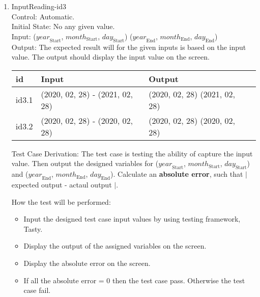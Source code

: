 \documentclass[12pt, titlepage]{article}
\begin{document}
\begin{enumerate}
\item{InputReading-id3\\}
Control: Automatic.\\
 
Initial State: No any given value.\\
Input: ($\mathit{year}_\text{Start}$, $\mathit{month}_\text{Start}$, $\mathit{day}_\text{Start}$)  ($\mathit{year}_\text{End}$, $\mathit{month}_\text{End}$, $\mathit{day}_\text{End}$)\\ 


Output: The expected result will for the given inputs is based on the input value.
The output should display the input value on the screen.

\noindent \begin{tabular}{l l l l} 
    \toprule		
    \textbf{id} & \textbf{Input} & \textbf{Output}\\ 
	\midrule
   id3.1 & (2020, 02, 28) - (2021, 02, 28) & (2020, 02, 28)  (2021, 02, 28)\\
   id3.2 & (2020, 02, 28) - (2020, 02, 28)  & (2020, 02, 28)  (2020, 02, 28)\\
    \bottomrule
  \end{tabular}


Test Case Derivation: The test case is testing the ability of capture the input value. Then output the designed variables for  ($\mathit{year}_\text{Start}$, $\mathit{month}_\text{Start}$, $\mathit{day}_\text{Start}$) and ($\mathit{year}_\text{End}$, $\mathit{month}_\text{End}$, $\mathit{day}_\text{End}$). Calculate an \textbf{absolute error}, such that $|$ expected output - actaul output $|$.


How the test will be performed:

\begin{itemize} 
\item Input the designed test case input values by using testing framework, Tasty. 
\item Display the output of the assigned variables on the screen.
\item  Display the absolute error on the screen.
\item  If all the absolute error = 0 then the test case pass. Otherwise the test case fail.
\end{itemize}

\end{enumerate}
\end{document}
